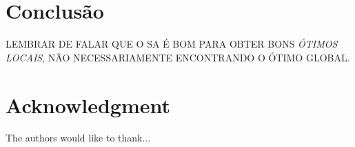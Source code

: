 \documentclass[conference]{IEEEtran}
\begin{document}
%



%


\section{Conclusão}
LEMBRAR DE FALAR QUE O SA É BOM PARA OBTER BONS \textit{ÓTIMOS LOCAIS}, NÃO NECESSARIAMENTE ENCONTRANDO O ÓTIMO GLOBAL.


\section*{Acknowledgment}
The authors would like to thank...
\end{document}
